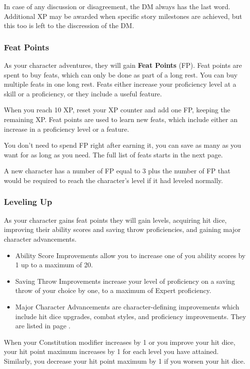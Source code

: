     In case of any discussion or disagreement, the DM always has the last word.
    Additional XP may be awarded when specific story milestones are achieved, but this too is left to the discression of the DM.


\subsubsection{Feat Points}
    As your character adventures, they will gain \textbf{Feat Points} (FP).
    Feat points are spent to buy feats, which can only be done as part of a long rest.
    You can buy multiple feats in one long rest.
    Feats either increase your proficiency level at a skill or a proficiency, or they include a useful feature.

    When you reach 10 XP, reset your XP counter and add one FP, keeping the remaining XP.
    Feat points are used to learn new feats, which include either an increase in a proficiency level or a feature.

    You don't need to spend FP right after earning it, you can save as many as you want for as long as you need.
    The full list of feats starts in the next page.

    A new character has a number of FP equal to 3 plus the number of FP that would be required to reach the character's level if it had leveled normally.

\subsubsection{Leveling Up}
    As your character gains feat points they will gain levels, acquiring hit dice, improving their ability scores and saving throw proficiencies, and gaining major character advancements.
    \begin{itemize}
        \item Ability Score Improvements allow you to increase one of you ability scores by 1 up to a maximum of 20.
        \item Saving Throw Improvements increase your level of proficiency on a saving throw of your choice by one, to a maximum of Expert proficiency.
        \item Major Character Advancements are character-defining improvements which include hit dice upgrades, combat styles, and proficiency improvements.
        They are listed in page \pageref{ssec::majorcharacteradvancement}.
    \end{itemize}

    When your Constitution modifier increases by 1 or you improve your hit dice, your hit point maximum increases by 1 for each level you have attained.
    Similarly, you decrease your hit point maximum by 1 if you worsen your hit dice.

